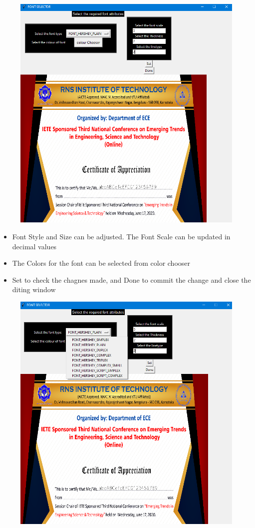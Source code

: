 \begin{figure}[H]
	\centering
	\includegraphics[width=0.85\linewidth]{"images/generation_qr_nqr/Screenshot (42)"}
	\label{fig:screenshot-42}
\end{figure}

\newpage
\begin{itemize}
	\item Font Style and Size can be adjusted. The Font Scale can be updated in decimal values
	\item The Colors for the font can be selected from color chooser
	\item Set to check the chagnes made, and Done to commit the change and close the diting window
\end{itemize}

\begin{figure}[H]
	\centering
	\includegraphics[width=0.7\linewidth]{"images/generation_qr_nqr/Screenshot (43)"}
	\label{fig:screenshot-43}
\end{figure}

